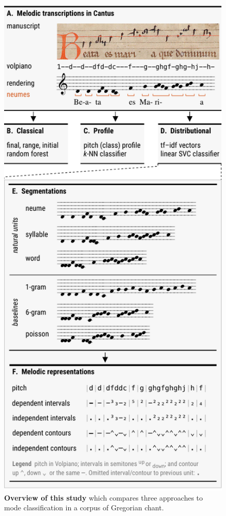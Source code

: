 \documentclass{article}
\begin{document}
\begin{figure}
    \centering
    \includegraphics{figs/fig01-overview.pdf}
    \caption{
        \textbf{Overview of this study}
        which compares three approaches to mode classification in a corpus of Gregorian chant.
}
\end{figure}
\end{document}
